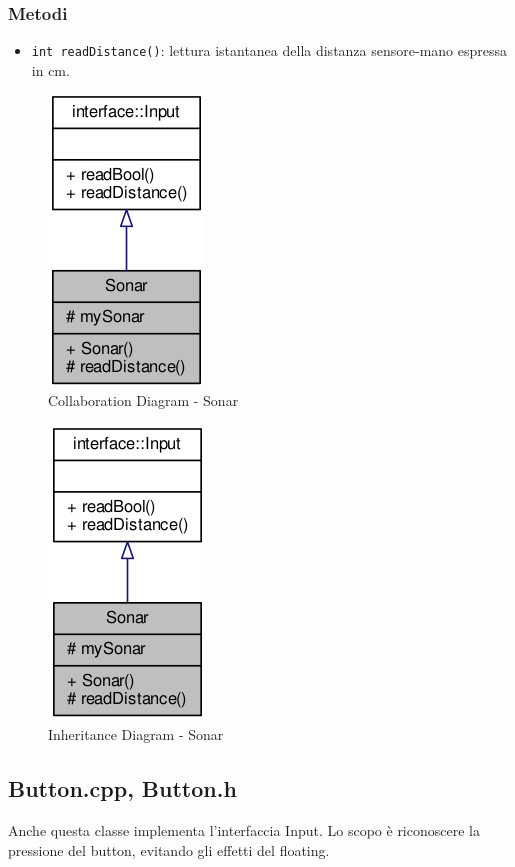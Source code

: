 \subsubsection{Metodi}
\begin{itemize}
	\item \texttt{int readDistance()}: lettura istantanea della distanza sensore-mano espressa in cm.
\end{itemize}
\begin{figure}[!ht]
	\centering
	\includegraphics[scale=.5]{img/UML/CollaborationDiagram/Sonar.png}
	\caption{Collaboration Diagram - Sonar}
\end{figure}
\begin{figure}[!ht]
	\centering
	\includegraphics[scale=.5]{img/UML/InheritanceDiagram/Sonar.png}
	\caption{Inheritance Diagram - Sonar}
\end{figure}

\newpage
\subsection{Button.cpp, Button.h}
Anche questa classe implementa l'interfaccia Input. Lo scopo è riconoscere la pressione del button, evitando gli effetti del floating.

